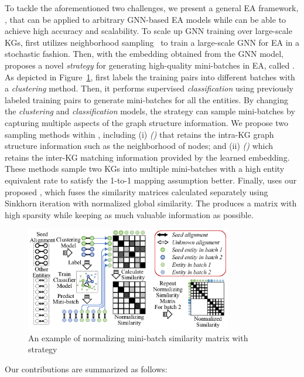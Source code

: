 To tackle the aforementioned two challenges, we present a general EA framework, \ClusterEA{}, that can be applied to arbitrary GNN-based EA models while can be able to achieve high accuracy and scalability.
To scale up GNN training over large-scale KGs, \ClusterEA{} first utilizes neighborhood sampling~\cite{GraphSAGE17} to train a large-scale GNN for EA in a stochastic fashion.
Then, with the embedding obtained from the GNN model, \ClusterEA{} proposes a novel \emph{strategy} for generating high-quality mini-batches in EA, called \Sampling{}. As depicted in Figure~\ref{fig:example}, \Sampling{} first labels the training pairs into different batches with a \emph{clustering} method. Then, it performs supervised \emph{classification} using previously labeled training pairs to generate mini-batches for all the entities. By changing the \emph{clustering} and \emph{classification} models, the strategy can sample mini-batches by capturing multiple aspects of the graph structure information. We propose two sampling methods within \Sampling{}, including
(i)  \emph{\MetisFullName{} (\MetisGCN{})} that retains the intra-KG graph structure information such as the neighborhood of nodes; and
(ii) \emph{\KMeansFullName{} (\KMeans{})} which retains the inter-KG matching information provided by the learned embedding.
These methods sample two KGs into multiple mini-batches with a high entity equivalent rate to satisfy the 1-to-1 mapping assumption better.
Finally, \ClusterEA{} uses our proposed \Merging{}, which fuses the similarity matrices calculated separately using Sinkhorn iteration with normalized global similarity. The \Merging{} produces a matrix with high sparsity while keeping as much valuable information as possible.
\begin{figure}[t]
\centering
\hspace{-8mm}\includegraphics[width=3.55in]{figs/example.eps}
\vspace{-4mm}
\caption{An example of normalizing mini-batch similarity matrix with \Sampling{} strategy}
\vspace{-4mm}
\label{fig:example}
\end{figure}
Our contributions are summarized as follows:

